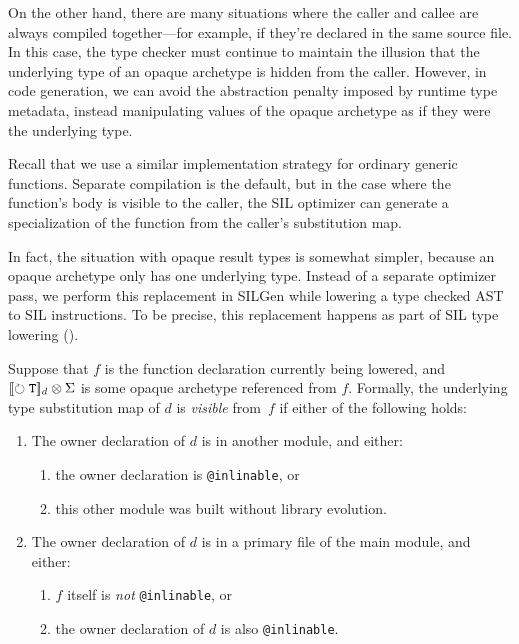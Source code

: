 \documentclass[../generics]{subfiles}
\begin{document}
On the other hand, there are many situations where the caller and callee are always compiled together---for example, if they're declared in the same source file. In this case, the type checker must continue to maintain the illusion that the underlying type of an opaque archetype is hidden from the caller. However, in code generation, we can avoid the abstraction penalty imposed by runtime type metadata, instead manipulating values of the opaque archetype as if they were the underlying type.

Recall that we use a similar implementation strategy for ordinary generic functions. Separate compilation is the default, but in the case where the function's body is visible to the caller, the SIL optimizer can generate a specialization of the function from the caller's substitution map.

In fact, the situation with opaque result types is somewhat simpler, because an opaque archetype only has one underlying type. Instead of a separate optimizer pass, we perform this replacement in SILGen while lowering a type checked AST to SIL instructions. To be precise, this replacement happens as part of SIL type lowering ().

\begin{definition}
Suppose that $f$ is the function declaration currently being lowered, and $[\![\circlearrowright \texttt{\texttt{T}}]\!]_d \otimes \Sigma$ is some opaque archetype referenced from $f$. Formally, the underlying type substitution map of $d$ is \emph{visible} from~$f$ if either of the following holds:
\begin{enumerate}
\item The owner declaration of $d$ is in another module, and either:
\begin{enumerate}
\item the owner declaration is \verb|@inlinable|, or
\item this other module was built without library evolution.
\end{enumerate}
\item The owner declaration of $d$ is in a primary file of the main module, and either:
\begin{enumerate}
\item $f$ itself is \emph{not} \verb|@inlinable|, or
\item the owner declaration of $d$ is also \verb|@inlinable|.
\end{enumerate}
\end{enumerate}
\end{definition}
\end{document}
